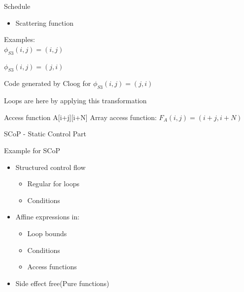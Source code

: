 \documentclass{beamer}
\begin{document}
\begin{frame}{Schedule}
\begin{itemize}
\item Scattering function
\end{itemize}

\pause

\begin{block}{ }
{\tiny}
\end{block}
Examples: \\
$\phi_{S3}(i,j) = (i,j)$

$\phi_{S3}(i,j) = (j,i)$

\pause

\begin{block}{Code generated by Cloog for $\phi_{S3}(i,j) = (j,i)$}
{\tiny}
\end{block}


Loops are \textbf{\color{red}{interchanged}} here by applying this transformation
\end{frame}

\begin{frame}{Access function}
A[i+j][i+N]
\linebreak\linebreak
Array access function: $F_A(i,j) = (i+j,i+N)$ 
\linebreak\linebreak
{\textbf {\color{red}{Change array access function for better locality}}} \\
\end{frame}


\begin{frame}{SCoP - Static Control Part}
\begin{block}{Example for SCoP}
{}
\end{block}

\begin{itemize}
\item Structured control flow
	\begin{itemize}
	\item Regular for loops
	\item Conditions
	\end{itemize}
\item Affine expressions in:
	\begin{itemize}
	\item Loop bounds
	\item Conditions
	\item Access functions
	\end{itemize}
\item Side effect free(Pure functions)
\end{itemize}

\end{frame}
\end{document}
